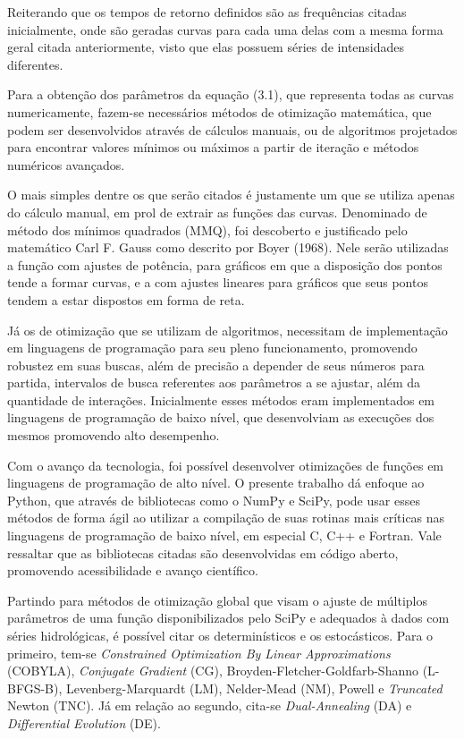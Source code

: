 \newpage

Reiterando que os tempos de retorno definidos são as frequências citadas inicialmente, onde são geradas curvas para cada uma delas com a mesma forma geral citada anteriormente, visto que elas possuem séries de intensidades diferentes.

Para a obtenção dos parâmetros da equação (3.1), que representa todas as curvas numericamente, fazem-se necessários métodos de otimização matemática, que podem ser desenvolvidos através de cálculos manuais, ou de algoritmos projetados para encontrar valores mínimos ou máximos a partir de iteração e métodos numéricos avançados.

O mais simples dentre os que serão citados é justamente um que se utiliza apenas do cálculo manual, em prol de extrair as funções das curvas. Denominado de método dos mínimos quadrados (MMQ), foi descoberto e justificado pelo matemático Carl F. Gauss como descrito por Boyer (1968). Nele serão utilizadas a função com ajustes de potência, para gráficos em que a disposição dos pontos tende a formar curvas, e a com ajustes lineares para gráficos que seus pontos tendem a estar dispostos em forma de reta.

Já os de otimização que se utilizam de algoritmos, necessitam de implementação em linguagens de programação para seu pleno funcionamento, promovendo robustez em suas buscas, além de precisão a depender de seus números para partida, intervalos de busca referentes aos parâmetros a se ajustar, além da quantidade de interações. Inicialmente esses métodos eram implementados em linguagens de programação de baixo nível, que desenvolviam as execuções dos mesmos promovendo alto desempenho. 

Com o avanço da tecnologia, foi possível desenvolver otimizações de funções em linguagens de programação de alto nível. O presente trabalho dá enfoque ao Python, que através de bibliotecas como o NumPy e SciPy, pode usar esses métodos de forma ágil ao utilizar a compilação de suas rotinas mais críticas nas linguagens de programação de baixo nível, em especial C, C++ e Fortran. Vale ressaltar que as bibliotecas citadas são desenvolvidas em código aberto, promovendo acessibilidade e avanço científico. 

Partindo para métodos de otimização global que visam o ajuste de múltiplos parâmetros de uma função disponibilizados pelo SciPy e adequados à dados com séries hidrológicas, é possível citar os determinísticos e os estocásticos. Para o primeiro, tem-se \textit{Constrained Optimization By Linear Approximations} (COBYLA), \textit{Conjugate Gradient} (CG), Broyden-Fletcher-Goldfarb-Shanno (L-BFGS-B), Levenberg-Marquardt (LM), Nelder-Mead (NM), Powell e \textit{Truncated} Newton (TNC). Já em relação ao segundo, cita-se \textit{Dual-Annealing} (DA) e \textit{Differential Evolution} (DE).

